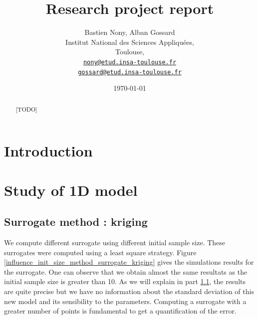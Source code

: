 \documentclass[hidelinks,12pt]{article}
\begin{document}
\title{Research project report}
\author{Bastien Nony, Alban Gossard\\
   Institut National des Sciences Appliquées,\\
   Toulouse,\\
   \href{mailto:nony@etud.insa-toulouse.fr}{   \texttt{nony@etud.insa-toulouse.fr}}\\
   \href{mailto:gossard@etud.insa-toulouse.fr}{   \texttt{gossard@etud.insa-toulouse.fr}}}
\date{\today}

\maketitle

\begin{abstract}
  [TODO]
\end{abstract}

\tableofcontents


\section*{Introduction}



\section{Study of 1D model}

\subsection{Surrogate method : kriging}

We compute different surrogate using different initial sample size. These surrogates were computed using a least square strategy. Figure \ref{influence_init_size_method_surrogate_kriging} gives the simulations results for the surrogate. One can observe that we obtain almost the same resultats as the initial sample size is greater than 10. As we will explain in part \ref{}, the results are quite precise but we have no information about the standard deviation of this new model and its sensibility to the parameters. Computing a surrogate with a greater number of points is fundamental to get a quantification of the error.
\end{document}
